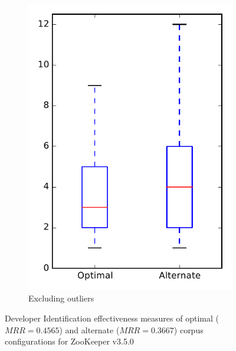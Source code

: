 \begin{figure}
\begin{subfigure}{.4\textwidth}
        \includegraphics[height=0.4\textheight]{figures/combo/dit_rq2_zookeeper_no_outlier}
        \caption{Excluding outliers}\label{fig:combo:dit:rq2:zookeeper_no_outlier}
    \end{subfigure}
\caption[Developer Identification effectiveness measures of optimal and alternate corpus configurations for ZooKeeper v3.5.0]%
{Developer Identification effectiveness measures of optimal ($MRR=0.4565$) and alternate ($MRR=0.3667$) corpus configurations for ZooKeeper v3.5.0}
\label{fig:combo:dit:rq2:zookeeper}
\end{figure}
